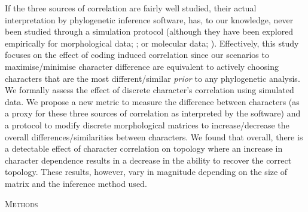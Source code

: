 \documentclass[12pt,letterpaper]{article}
\renewcommand{\section}[1]{%
\bigskip
\begin{center}
\begin{Large}
\normalfont\scshape #1
\medskip
\end{Large}
\end{center}}
\begin{document}
If the three sources of correlation are fairly well studied, their actual interpretation by phylogenetic inference software, has, to our knowledge, never been studied through a simulation protocol (although they have been explored empirically for morphological data; \citealt{Davalos01072014}; or molecular data; \citealt{ZouConvergence}).
Effectively, this study focuses on the effect of coding induced correlation since our scenarios to maximise/minimise character difference are equivalent to actively choosing characters that are the most different/similar \textit{prior} to any phylogenetic analysis.
We formally assess the effect of discrete character's correlation using simulated data.
We propose a new metric to measure the difference between characters (as a proxy for these three sources of correlation as interpreted by the software) and a protocol to modify discrete morphological matrices to increase/decrease the overall differences/similarities between characters.
We found that overall, there is a detectable effect of character correlation on topology where an increase in character dependence results in a decrease in the ability to recover the correct topology.
These results, however, vary in magnitude depending on the size of matrix and the inference method used.

\section{Methods}
\end{document}
